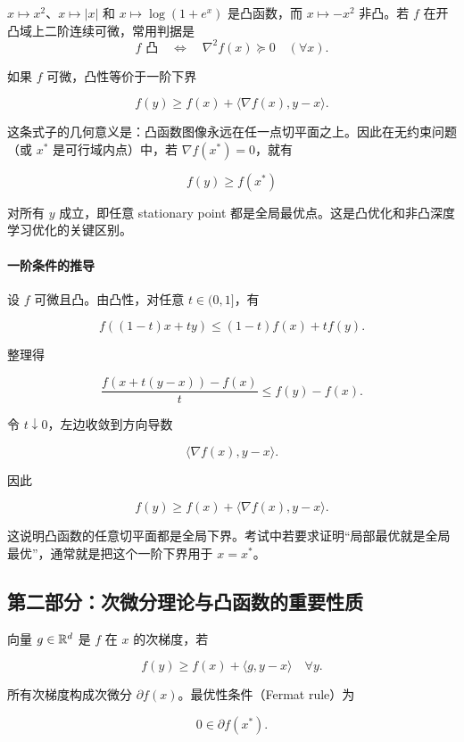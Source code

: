 \documentclass[11pt]{ctexart}
\begin{document}
\begin{example}[一维判断]
\(x\mapsto x^2\)、\(x\mapsto |x|\) 和 \(x\mapsto\log(1+e^x)\) 是凸函数，而 \(x\mapsto-x^2\) 非凸。若 \(f\) 在开凸域上二阶连续可微，常用判据是
\[
  f\text{ 凸}\quad\Longleftrightarrow\quad \nabla^2f(x)\succeq0\quad(\forall x).
\]
\end{example}

如果 \(f\) 可微，凸性等价于一阶下界

\[
  f(y)\ge f(x)+\langle \nabla f(x),y-x\rangle.
\]

这条式子的几何意义是：凸函数图像永远在任一点切平面之上。因此在无约束问题（或 \(x^*\) 是可行域内点）中，若 \(\nabla f(x^*)=0\)，就有

\[
  f(y)\ge f(x^*)
\]

对所有 \(y\) 成立，即任意 stationary point 都是全局最优点。这是凸优化和非凸深度学习优化的关键区别。

\paragraph{一阶条件的推导}

设 \(f\) 可微且凸。由凸性，对任意 \(t\in(0,1]\)，有

\[
  f((1-t)x+ty)
  \le
  (1-t)f(x)+tf(y).
\]

整理得

\[
  \frac{f(x+t(y-x))-f(x)}{t}
  \le
  f(y)-f(x).
\]

令 \(t\downarrow0\)，左边收敛到方向导数

\[
  \langle\nabla f(x),y-x\rangle.
\]

因此

\[
  f(y)\ge f(x)+\langle\nabla f(x),y-x\rangle.
\]

这说明凸函数的任意切平面都是全局下界。考试中若要求证明“局部最优就是全局最优”，通常就是把这个一阶下界用于 \(x=x^*\)。

\subsection{第二部分：次微分理论与凸函数的重要性质}

\begin{definition}[次梯度与次微分]
向量 \(g\in\mathbb{R}^d\) 是 \(f\) 在 \(x\) 的次梯度，若

\[
  f(y)\ge f(x)+\langle g,y-x\rangle
  \quad
  \forall y.
\]

所有次梯度构成次微分 \(\partial f(x)\)。最优性条件（Fermat rule）为

\[
  0\in \partial f(x^*).
\]
\end{definition}
\end{document}
